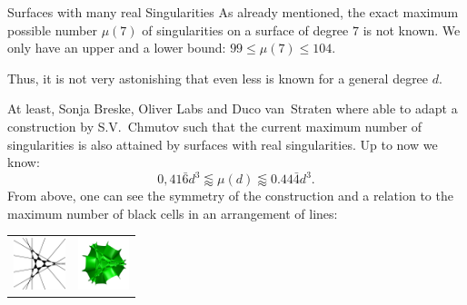 \begin{surferPage}[216 Singularities]{Surfaces with many real Singularities}
    As already mentioned, the exact maximum possible number
    $\mu(7)$ of singularities on a surface of degree $7$ is not known.
    We only have an upper and a lower bound: $99\le \mu(7) \le 104$. 


    Thus, it is not very astonishing that even less is known for a general degree $d$. 

    At least, Sonja Breske, Oliver Labs and Duco van~Straten where able to adapt a
    construction by S.V.\ Chmutov such that the current maximum
    number of singularities is also attained by surfaces with real
    singularities. 
    Up to now we know:
    \[0,41\bar{6}d^3 \lessapprox \mu(d) \lessapprox 0.44\bar{4} d^3.\]
     From above, one can see the symmetry of the construction and a relation to
    the maximum number of black cells in an arrangement of lines:
    \begin{center}
      \begin{tabular}{c@{\qquad}c}
        \includegraphics[height=1.5cm]{./../../common/images/vielesing.pdf}
        &
        \includegraphics[height=1.5cm]{./../../common/images/p9surface_von_oben}
      \end{tabular}
    \end{center}
\end{surferPage}
